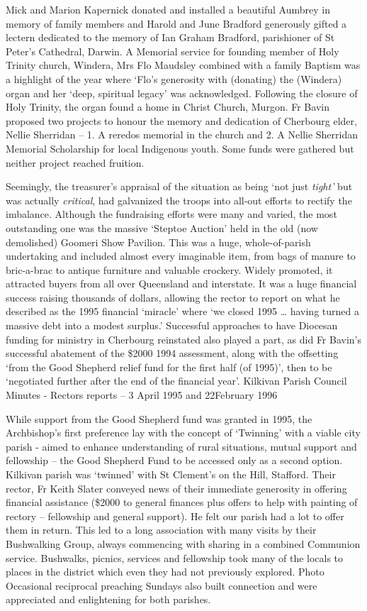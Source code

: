 Mick and Marion Kapernick donated and installed a beautiful Aumbrey in memory of family members and Harold and June Bradford generously gifted a lectern dedicated to the memory of Ian Graham Bradford, parishioner of St Peter's Cathedral, Darwin. A Memorial service for founding member of Holy Trinity church, Windera, Mrs Flo Maudsley combined with a family Baptism was a highlight of the year where `Flo's generosity with (donating) the (Windera) organ and her `deep, spiritual legacy' was acknowledged. Following the closure of Holy Trinity, the organ found a home in Christ Church, Murgon. Fr Bavin proposed two projects to honour the memory and dedication of Cherbourg elder, Nellie Sherridan -- 1. A reredos memorial in the church and 2. A Nellie Sherridan Memorial Scholarship for local Indigenous youth. Some funds were gathered but neither project reached fruition.

Seemingly, the treasurer's appraisal of the situation as being `not just \emph{tight'} but was actually \emph{critical}, had galvanized the troops into all-out efforts to rectify the imbalance. Although the fundraising efforts were many and varied, the most outstanding one was the massive `Steptoe Auction' held in the old (now demolished) Goomeri Show Pavilion. This was a huge, whole-of-parish undertaking and included almost every imaginable item, from bags of manure to bric-a-brac to antique furniture and valuable crockery. Widely promoted, it attracted buyers from all over Queensland and interstate. It was a huge financial success raising thousands of dollars, allowing the rector to report on what he described as the 1995 financial `miracle' where `we closed 1995 \ldots{} having turned a massive debt into a modest surplus.' Successful approaches to have Diocesan funding for ministry in Cherbourg reinstated also played a part, as did Fr Bavin's successful abatement of the \$2000 1994 assessment, along with the offsetting `from the Good Shepherd relief fund for the first half (of 1995)', then to be `negotiated further after the end of the financial year'. Kilkivan Parish Council Minutes - Rectors reports -- 3 April 1995 and 22February 1996

While support from the Good Shepherd fund was granted in 1995, the Archbishop's first preference lay with the concept of `Twinning' with a viable city parish - aimed to enhance understanding of rural situations, mutual support and fellowship -- the Good Shepherd Fund to be accessed only as a second option. Kilkivan parish was `twinned' with St Clement's on the Hill, Stafford. Their rector, Fr Keith Slater conveyed news of their immediate generosity in offering financial assistance (\$2000 to general finances plus offers to help with painting of rectory -- fellowship and general support). He felt our parish had a lot to offer them in return. This led to a long association with many visits by their Bushwalking Group, always commencing with sharing in a combined Communion service. Bushwalks, picnics, services and fellowship took many of the locals to places in the district which even they had not previously explored. Photo Occasional reciprocal preaching Sundays also built connection and were appreciated and enlightening for both parishes.

